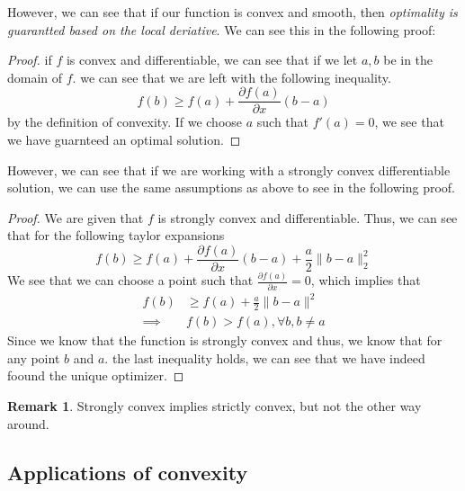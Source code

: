 \documentclass[11pt]{article}
\theoremstyle{definition}
\newtheorem{remark}{Remark}[section]
\begin{document}
However, we can see that if our function is convex and smooth, then \emph{optimality is guarantted based on the local deriative}. We can see this in the following proof:
\begin{proof}
  if $f$ is convex and differentiable, we can see that if we let $a,b$ be in the domain of $f$. we can see that we are left with the following inequality. 
  \[
  f(b) \geq f(a) + \frac{\partial f(a)}{\partial x}(b-a)
  \]
  by the definition of convexity. If we choose $a$ such that $f'(a) = 0$, we see that we have guarnteed an optimal solution. 
\end{proof}
However, we can see that if we are working with a strongly convex differentiable solution, we can use the same assumptions as above to see in the following proof. 
\begin{proof}
  We are given that $f$ is strongly convex and differentiable. Thus, we can see that for the following taylor expansions 
  \[
  f(b) \geq f(a) + \frac{\partial f(a)}{\partial x}(b-a) + \frac{a}{2} \|b - a\|_2^2
  \]
  We see that we can choose a point such that $\frac{\partial f(a)}{\partial x} = 0$, which implies that 
  \begin{align*}
    f(b) &\geq f(a) + \frac{a}{2} \|b - a\|^2\\
    \implies  & f(b)  > f(a), \forall b, b \neq a
  \end{align*}
  Since we know that the function is strongly convex and thus, we know that for any point $b$ and $a$. the last inequality holds, we can see that we have indeed foound the unique optimizer.
\end{proof}
\begin{remark}
  Strongly convex implies strictly convex, but not the other way around. 
\end{remark}
\subsection{Applications of convexity}
\end{document}
